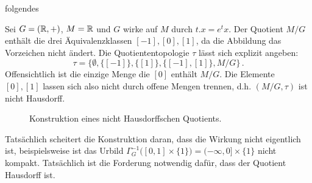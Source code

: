 folgendes \begin{beispiel}
Sei $G=(\mathbb{R},+)$, $M=\mathbb{R}$ und $G$ wirke auf $M$ durch $t.x=e^tx$.
Der Quotient $M/G$ enthält die drei Äquivalenzklassen $[-1],[0],[1]$, da die
Abbildung das Vorzeichen nicht ändert.
Die Quotiententopologie $\tau$ lässt sich explizit angeben:
\begin{equation}
\tau =\big\{\emptyset,\{[-1]\},\{[1]\},\{[-1],[1]\},M/G\big\}\,.
\end{equation}
Offensichtlich ist die einzige Menge die $[0]$ enthält $M/G$. Die Elemente
$[0],[1]$ lassen sich also nicht durch offene Mengen trennen, d.h. $(M/G,\tau)$
ist nicht Hausdorff.
\begin{figure}[!htbp]
\centering
{}
\caption{Konstruktion eines nicht Hausdorffschen Quotients.}
\end{figure}
\end{beispiel}
Tatsächlich scheitert die Konstruktion daran, dass die Wirkung nicht eigentlich
ist, beispielsweise ist das Urbild $\Gamma_G^{-1}\big([0,1]\times
\{1\}\big)=(-\infty,0]\times \{1\}$ nicht kompakt.
Tatsächlich ist die Forderung notwendig dafür, dass der Quotient Hausdorff ist.

